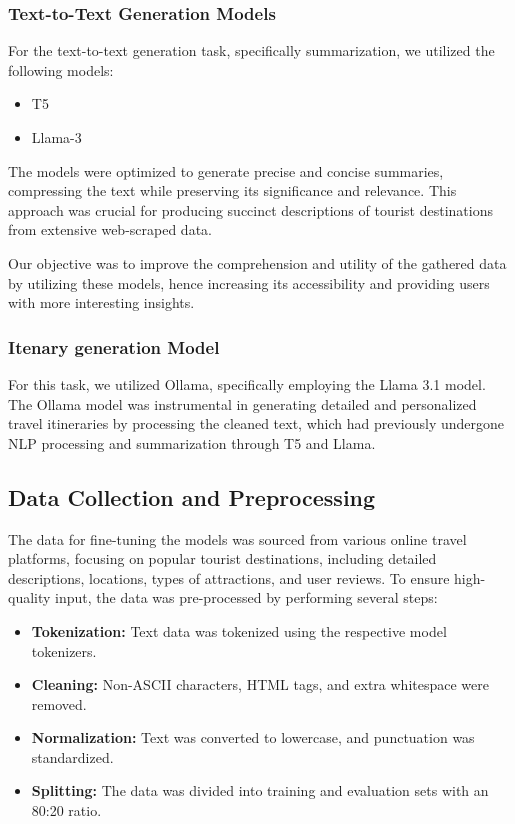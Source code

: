 \documentclass[conference]{IEEEtran}
\begin{document}
        \subsubsection{Text-to-Text Generation Models}
            For the text-to-text generation task, specifically summarization, we utilized the following models:
            \begin{itemize}
                \item T5
                \item Llama-3
            \end{itemize}

            The models were optimized to generate precise and concise summaries, compressing the text while preserving its significance and relevance. This approach was crucial for producing succinct descriptions of tourist destinations from extensive web-scraped data.

            Our objective was to improve the comprehension and utility of the gathered data by utilizing these models, hence increasing its accessibility and providing users with more interesting insights.
        {\\}
         \subsubsection{Itenary generation Model}
            For this task, we utilized Ollama, specifically employing the Llama 3.1 model. The Ollama model was instrumental in generating detailed and personalized travel itineraries by processing the cleaned text, which had previously undergone NLP processing and summarization through T5 and Llama.
{\\}
    \subsection{Data Collection and Preprocessing}

        The data for fine-tuning the models was sourced from various online travel platforms, focusing on popular tourist destinations, including detailed descriptions, locations, types of attractions, and user reviews. To ensure high-quality input, the data was pre-processed by performing several steps:

        \begin{itemize}
            \item \textbf{Tokenization:} Text data was tokenized using the respective model tokenizers.
            \item \textbf{Cleaning:} Non-ASCII characters, HTML tags, and extra whitespace were removed.
            \item \textbf{Normalization:} Text was converted to lowercase, and punctuation was standardized.
            \item \textbf{Splitting:} The data was divided into training and evaluation sets with an 80:20 ratio.
        \end{itemize}
        
\end{document}
